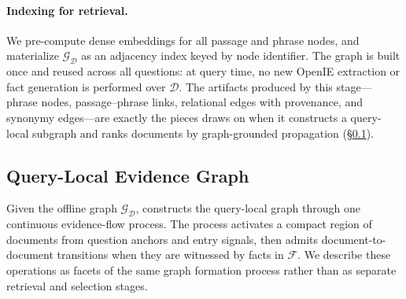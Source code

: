 \paragraph{Indexing for retrieval.}
We pre-compute dense embeddings for all passage and phrase nodes, and
materialize $\mathcal{G}_{\mathcal{D}}$ as an adjacency index keyed by
node identifier. The graph is built once and reused across all questions:
at query time, no new OpenIE extraction or fact generation is performed
over $\mathcal{D}$. The artifacts produced by this stage---phrase nodes,
passage--phrase links, relational edges with provenance, and synonymy
edges---are exactly the pieces \methodname{} draws on when it constructs
a query-local subgraph and ranks documents by graph-grounded propagation
(\S\ref{sec:method:flow}).

\subsection{Query-Local Evidence Graph}
\label{sec:method:flow}

Given the offline graph $\mathcal{G}_{\mathcal{D}}$, \methodname{} constructs the query-local
graph through one continuous evidence-flow process. The process activates a
compact region of documents from question anchors and entry signals, then
admits document-to-document transitions when they are witnessed by facts in
$\mathcal{F}$. We describe these operations as facets of the same graph
formation process rather than as separate retrieval and selection stages.


